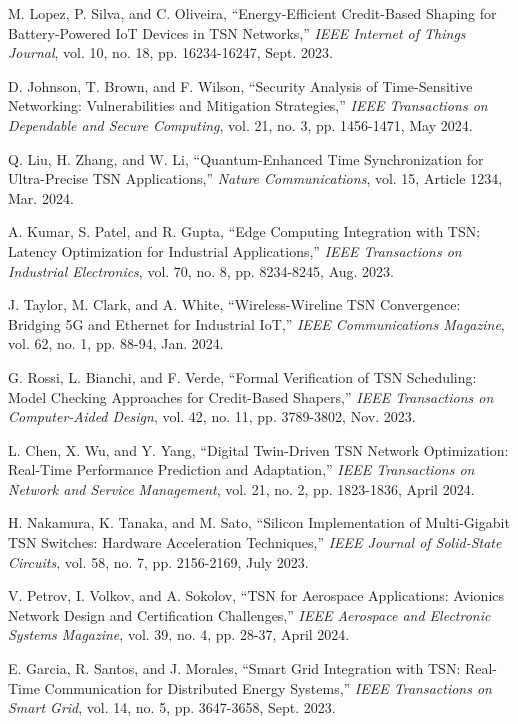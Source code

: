 \documentclass[10pt, journal, compsoc]{IEEEtran}
\begin{document}
\begin{thebibliography}{99}
M. Lopez, P. Silva, and C. Oliveira, ``Energy-Efficient Credit-Based Shaping for Battery-Powered IoT Devices in TSN Networks,'' \textit{IEEE Internet of Things Journal}, vol. 10, no. 18, pp. 16234-16247, Sept. 2023.

D. Johnson, T. Brown, and F. Wilson, ``Security Analysis of Time-Sensitive Networking: Vulnerabilities and Mitigation Strategies,'' \textit{IEEE Transactions on Dependable and Secure Computing}, vol. 21, no. 3, pp. 1456-1471, May 2024.

Q. Liu, H. Zhang, and W. Li, ``Quantum-Enhanced Time Synchronization for Ultra-Precise TSN Applications,'' \textit{Nature Communications}, vol. 15, Article 1234, Mar. 2024.

A. Kumar, S. Patel, and R. Gupta, ``Edge Computing Integration with TSN: Latency Optimization for Industrial Applications,'' \textit{IEEE Transactions on Industrial Electronics}, vol. 70, no. 8, pp. 8234-8245, Aug. 2023.

J. Taylor, M. Clark, and A. White, ``Wireless-Wireline TSN Convergence: Bridging 5G and Ethernet for Industrial IoT,'' \textit{IEEE Communications Magazine}, vol. 62, no. 1, pp. 88-94, Jan. 2024.

G. Rossi, L. Bianchi, and F. Verde, ``Formal Verification of TSN Scheduling: Model Checking Approaches for Credit-Based Shapers,'' \textit{IEEE Transactions on Computer-Aided Design}, vol. 42, no. 11, pp. 3789-3802, Nov. 2023.

L. Chen, X. Wu, and Y. Yang, ``Digital Twin-Driven TSN Network Optimization: Real-Time Performance Prediction and Adaptation,'' \textit{IEEE Transactions on Network and Service Management}, vol. 21, no. 2, pp. 1823-1836, April 2024.

H. Nakamura, K. Tanaka, and M. Sato, ``Silicon Implementation of Multi-Gigabit TSN Switches: Hardware Acceleration Techniques,'' \textit{IEEE Journal of Solid-State Circuits}, vol. 58, no. 7, pp. 2156-2169, July 2023.

V. Petrov, I. Volkov, and A. Sokolov, ``TSN for Aerospace Applications: Avionics Network Design and Certification Challenges,'' \textit{IEEE Aerospace and Electronic Systems Magazine}, vol. 39, no. 4, pp. 28-37, April 2024.

E. Garcia, R. Santos, and J. Morales, ``Smart Grid Integration with TSN: Real-Time Communication for Distributed Energy Systems,'' \textit{IEEE Transactions on Smart Grid}, vol. 14, no. 5, pp. 3647-3658, Sept. 2023.


\end{thebibliography}
\end{document}
